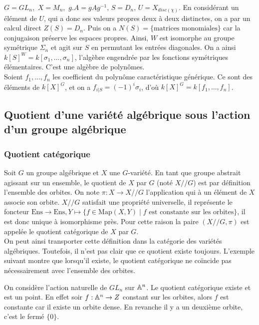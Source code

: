 \begin{ex}
$G=GL_n$,\, $X=M_n$,\, $g.A=gAg^{-1},\, S=D_n,\, U=X_{disc(\chi )}$. En considérant un élément de $U$, qui a donc ses valeurs propres deux à deux distinctes, on a par un calcul direct $Z(S)=D_n$. Puis on a $N(S)=\lbrace\textrm{matrices monomiales}\rbrace$ car la conjugaison préserve les espaces propres. Ainsi, $W$ est isomorphe au groupe symétrique $\Sigma_n$ et agit sur $S$ en permutant les entrées diagonales. On a ainsi $k[S]^W=k[\sigma_1,...,\sigma _n]$, l'algèbre engendrée par les fonctions symétriques élémentaires. C'est une algèbre de polynômes.\\
Soient $f_1,...,f_n$ les coefficient du polynôme caractéristique générique. Ce sont des éléments de $k[X]^G$, et on a $f_{i| S}=(-1)^i\sigma _i$, d'où $k[X]^G=k[f_1,...,f_n]$.
\end{ex}

\subsection{Quotient d'une variété algébrique sous l'action d'un groupe algébrique}

\subsubsection{Quotient catégorique}

Soit $G$ un groupe algébrique et $X$ une $G$-variété. En tant que groupe abstrait agissant sur un ensemble, le quotient de $X$ par $G$ (noté $X//G$) est par définition l'ensemble des orbites. On note $\pi:X \rightarrow X//G$ l'application qui à un élément de $X$ associe son orbite. $X//G$ satisfait une propriété universelle, il représente le foncteur $\textrm{Ens}\rightarrow \textrm{Ens}, Y\mapsto \lbrace f\in \textrm{Map}(X, Y)\mid f \textrm{ est constante sur les orbites} \rbrace$, il est donc unique à isomorphisme près. Pour cette raison la paire $(X//G, \pi)$ est appelée le quotient catégorique de $X$ par $G$. \\ 
On peut ainsi transporter cette définition dans la catégorie des variétés algébriques. Toutefois, il n'est pas clair que ce quotient existe toujours. L'exemple suivant montre que lorsqu'il existe, le quotient catégorique ne coïncide pas nécessairement avec l'ensemble des orbites.

\begin{ex}
On considère l'action naturelle de $GL_n$ sur $\mathbb{A}^n$. Le quotient catégorique existe et est un point. En effet soir $f:\mathbb{A}^n\rightarrow Z$ constant sur les orbites, alors $f$ est constante car il existe un orbite dense. En revanche il y a un deuxième orbite, c'est le fermé $\lbrace 0\rbrace$. 
\end{ex}

